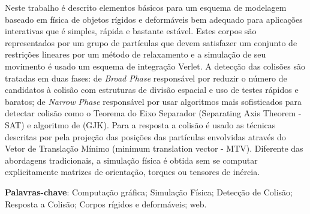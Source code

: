 \begin{resumo}
	\begin{SingleSpace}
		Neste trabalho é descrito elementos básicos para um esquema de modelagem baseado em física de objetos rígidos e deformáveis bem adequado para aplicações interativas que é simples, rápida e bastante estável. Estes corpos são representados por um grupo de partículas que devem satisfazer um conjunto de restrições lineares por um método de relaxamento e a simulação de seu movimento é usado um esquema de integração Verlet. A detecção das colisões são tratadas em duas fases: de \textit{Broad Phase} responsável por reduzir o número de candidatos à colisão com estruturas de divisão espacial e uso de testes rápidos e baratos; de \textit{Narrow Phase} responsável por usar algoritmos mais sofisticados para detectar colisão como o Teorema do Eixo Separador (Separating Axis Theorem - SAT) e algoritmo de  (GJK). Para a resposta a colisão é usado as técnicas descritas por  pela projeção das posições das partículas envolvidas através do Vetor de Translação Mínimo (minimum translation vector - MTV). Diferente das abordagens tradicionais, a simulação física é obtida sem se computar explicitamente matrizes de orientação, torques ou tensores de inércia.
	\end{SingleSpace}
	\vspace{\onelineskip}
	\textbf{Palavras-chave}: Computação gráfica; Simulação Física; Detecção de Colisão; Resposta a Colisão; Corpos rígidos e deformáveis; web.
\end{resumo}


